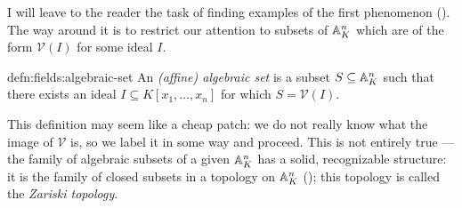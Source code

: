 I will leave to the reader the task of finding examples of the first
phenomenon
(). The
way around it is to restrict our attention to subsets of $\mathbb{A}^n_K$
which are of the form $\mathcal{V}(I)$ for some ideal $I$.
\begin{defn}{}{defn:fields:algebraic-set}
  An \emph{(affine) algebraic set} is a subset $S \subseteq \mathbb{A}^n_K$
  such that there exists an ideal $I \subseteq K[x_1, \dots, x_n]$ for
  which $S = \mathcal{V}(I)$.
\end{defn}
This definition may seem like a cheap patch: we do not really know
what the image of $\mathcal{V}$ is, so we label it in some way and
proceed.  This is not entirely true --- the family of algebraic
subsets of a given $\mathbb{A}^n_K$ has a solid, recognizable structure: it is
the family of closed subsets in a topology on $\mathbb{A}^n_K$
(); this
topology is called the \emph{Zariski topology}.

